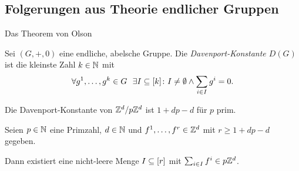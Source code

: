 \subsection{Folgerungen aus Theorie endlicher Gruppen}

\begin{frame}{Das Theorem von Olson}

	\begin{definition}
		Sei $(G,+,0)$ eine endliche, abelsche Gruppe.
		Die {\em Davenport-Konstante $D(G)$} ist die kleinste Zahl $k\in\mathbb{N}$ mit 
		$$
		\forall g^1,\dots,g^k \in G~~\exists I\subseteq[k]\colon I\neq\emptyset \wedge \sum_{i\in I}g^i=0 .
		$$
	\end{definition}

	\begin{theorem}[Olson, 1969]
		Die Davenport-Konstante von $\mathbb{Z}^d/p\mathbb{Z}^d$ ist $1+dp-d$ für $p$ prim.
	\end{theorem}

	\pause
	\begin{korollar}
		Seien $p\in\mathbb{N}$ eine Primzahl, $d\in\mathbb{N}$ und $f^1,\dots,f^r\in\mathbb{Z}^d$ mit $r\geq 1+dp-d$ gegeben.
		
		Dann existiert eine nicht-leere Menge $I\subseteq[r]$ mit $\sum_{i\in I}f^i\in p\mathbb{Z}^d$.
	\end{korollar}
\end{frame}